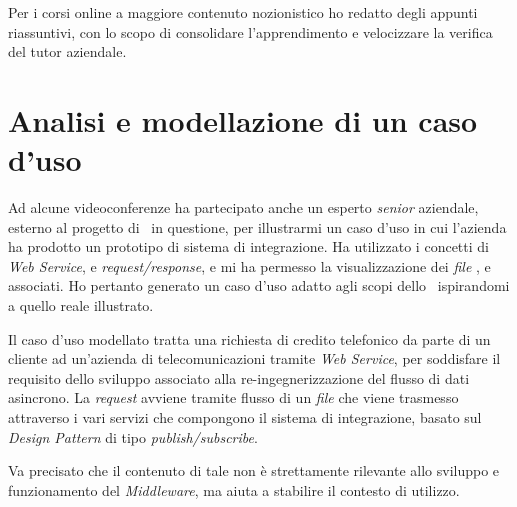 Per i corsi online a maggiore contenuto nozionistico ho redatto degli appunti riassuntivi, con lo scopo di consolidare l'apprendimento e velocizzare la verifica del tutor aziendale.

\section{Analisi e modellazione di un caso d'uso}

Ad alcune videoconferenze ha partecipato anche un esperto \textit{senior} aziendale, esterno al progetto di \stage\ in questione, per illustrarmi un caso d'uso in cui l'azienda ha prodotto un prototipo di sistema di integrazione. Ha utilizzato i concetti di \textit{Web Service},  e \textit{request/response}, e mi ha permesso la visualizzazione dei \textit{file} ,  e  associati.
Ho pertanto generato un caso d'uso adatto agli scopi dello \stage\ ispirandomi a quello reale illustrato.

Il caso d'uso modellato tratta una richiesta di credito telefonico da parte di un cliente ad un'azienda di telecomunicazioni tramite \textit{Web Service}, per soddisfare il requisito dello sviluppo associato alla re-ingegnerizzazione del flusso di dati asincrono.
La \textit{request} avviene tramite flusso di un \textit{file}  che viene trasmesso attraverso i vari servizi che compongono il sistema di integrazione, basato sul \textit{Design Pattern} di tipo \textit{publish/subscribe}.

Va precisato che il contenuto di tale  non è strettamente rilevante allo sviluppo e funzionamento del \textit{Middleware}, ma aiuta a stabilire il contesto di utilizzo.


